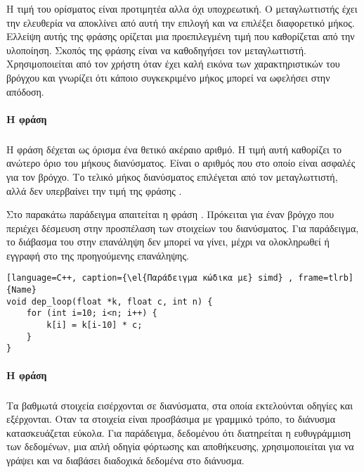 Η τιμή του ορίσματος είναι προτιμητέα αλλα όχι υποχρεωτική. Ο μεταγλωττιστής έχει την ελευθερία να αποκλίνει από αυτή την επιλογή και να επιλέξει διαφορετικό μήκος. Ελλείψη αυτής της φράσης ορίζεται μια προεπιλεγμένη τιμή που καθορίζεται από την υλοποίηση. Σκοπός της φράσης \emph{} είναι να καθοδηγήσει τον μεταγλωττιστή. Χρησιμοποιείται από τον χρήστη όταν έχει καλή εικόνα των χαρακτηριστικών του βρόγχου και γνωρίζει ότι κάποιο συγκεκριμένο μήκος μπορεί να ωφελήσει στην απόδοση.
\ \\

\paragraph{H φράση \emph{}}
\subparagraph{}
Η φράση \emph{} δέχεται ως όρισμα ένα θετικό ακέραιο αριθμό. Η τιμή αυτή καθορίζει το ανώτερο όριο του μήκους διανύσματος. Είναι ο αριθμός που στο οποίο είναι ασφαλές για τον βρόγχο. Το τελικό μήκος διανύσματος επιλέγεται από τον μεταγλωττιστή, αλλά δεν υπερβαίνει την τιμή της φράσης 
\emph{}.

Στο παρακάτω παράδειγμα απαιτείται η φράση \emph{}. Πρόκειται για έναν βρόγχο που περιέχει
 δέσμευση στην προσπέλαση των στοιχείων του διανύσματος.
 Για παράδειγμα, το διάβασμα του \emph{\en{[i-10]}} στην επανάληψη \emph{} δεν μπορεί να γίνει, μέχρι να ολοκληρωθεί ή εγγραφή στο \emph{} της προηγούμενης επανάληψης.
 
 \clearpage

\begin{lstlisting}[language=C++, caption={\el{Παράδειγμα κώδικα με} simd} , frame=tlrb]{Name}
void dep_loop(float *k, float c, int n) {
	for (int i=10; i<n; i++) {
		k[i] = k[i-10] * c;
	}
}
\end{lstlisting}

\paragraph{H φράση \emph{}}
\subparagraph{}
Τα βαθμωτά στοιχεία εισέρχονται σε διανύσματα, στα οποία εκτελούνται οδηγίες \emph{} και εξέρχονται. Οταν τα στοιχεία είναι προσβάσιμα με γραμμικό τρόπο, το διάνυσμα κατασκευάζεται εύκολα. Για παράδειγμα, δεδομένου ότι διατηρείται η ευθυγράμμιση των δεδομένων, μια απλή \emph{} οδηγία φόρτωσης και αποθήκευσης, χρησιμοποιείται για να γράψει και να διαβάσει διαδοχικά δεδομένα στο διάνυσμα.

